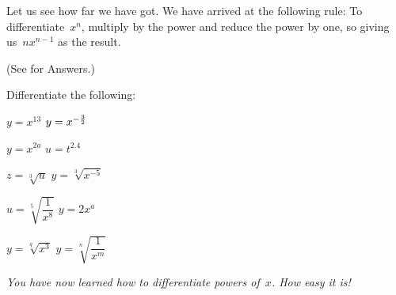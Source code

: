  Let us see how far we have got. We
have arrived at the following rule: To differentiate~$x^n$,
multiply by the power and reduce the power by
one, so giving us~$nx^{n-1}$ as the result.


 (See  for Answers.)

Differentiate the following:
\begin{Problems}[2]
 $y = x^{13}$
 $y = x^{-\frac{3}{2}}$

 $y = x^{2a}$
 $u = t^{2.4}$

 $z = \sqrt[3]{u}$
 $y = \sqrt[3]{x^{-5}}$

 $u = \sqrt[5]{\dfrac{1}{x^8}}$
 $y = 2x^a$

 $y = \sqrt[q]{x^3}$
 $y = \sqrt[n]{\dfrac{1}{x^m}}$
\end{Problems}

\textit{You have now learned how to differentiate powers
of~$x$. How easy it is!}
%